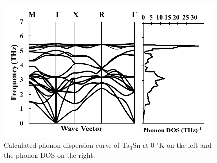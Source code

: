 \pagebreak
\begin{figure}[H]
	\centering
	\includegraphics[width=\textwidth]{Chapter-4/Figures/Ta3Snphonondos.pdf}
	\caption{Calculated phonon dispersion curve of Ta$_3$Sn at 0 $^\circ$K on the left and the phonon DOS on the right.}
	\label{Ch4-figure:Ta3Snphonon}
\end{figure}

